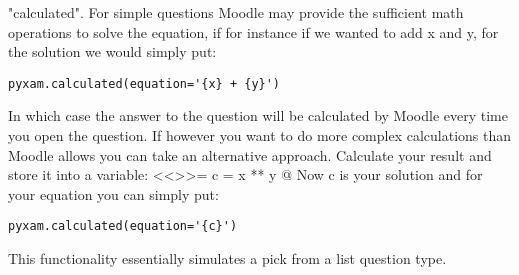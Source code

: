 \documentclass[12pt]{exam}
\begin{document}
"calculated". For simple questions Moodle may provide the sufficient math operations to solve the equation, if for
instance if we wanted to add x and y, for the solution we would simply put:
\begin{verbatim}
pyxam.calculated(equation='{x} + {y}')
\end{verbatim}In which case the answer to the question will be calculated by Moodle every time you open the question. If however you
want to do more complex calculations than Moodle allows you can take an alternative approach. Calculate your result and
store it into a variable:
<<>>=
c = x ** y
@
Now c is your solution and for your equation you can simply put:
\begin{verbatim}
pyxam.calculated(equation='{c}')
\end{verbatim}This functionality essentially simulates a pick from a list question type.
\end{document}
